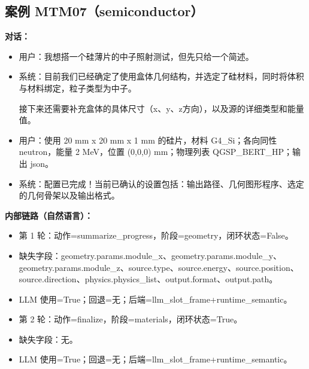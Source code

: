 \documentclass[11pt]{ctexart}
\begin{document}
\subsection{案例 MTM07（semiconductor）}
\textbf{对话：}
\begin{itemize}
\item 用户：我想搭一个硅薄片的中子照射测试，但先只给一个简述。
\item 系统：目前我们已经确定了使用盒体几何结构，并选定了硅材料，同时将体积与材料绑定，粒子类型为中子。

接下来还需要补充盒体的具体尺寸（x、y、z方向），以及源的详细类型和能量值。
\item 用户：使用 20 mm x 20 mm x 1 mm 的硅片，材料 G4\_Si；各向同性 neutron，能量 2 MeV，位置 (0,0,0) mm；物理列表 QGSP\_BERT\_HP；输出 json。
\item 系统：配置已完成！当前已确认的设置包括：输出路径、几何图形程序、选定的几何骨架以及输出格式。
\end{itemize}
\textbf{内部链路（自然语言）：}
\begin{itemize}
\item 第 1 轮：动作=summarize\_progress，阶段=geometry，闭环状态=False。
\item 缺失字段：geometry.params.module\_x、geometry.params.module\_y、geometry.params.module\_z、source.type、source.energy、source.position、source.direction、physics.physics\_list、output.format、output.path。
\item LLM 使用=True；回退=无；后端=llm\_slot\_frame+runtime\_semantic。
\item 第 2 轮：动作=finalize，阶段=materials，闭环状态=True。
\item 缺失字段：无。
\item LLM 使用=True；回退=无；后端=llm\_slot\_frame+runtime\_semantic。
\end{itemize}
\end{document}
